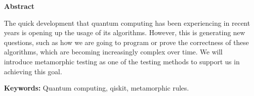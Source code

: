 \newpage

\thispagestyle{empty}

\begin{center}

{\bf \Huge Abstract}

  \end{center}
\vspace{1cm}

The quick development that quantum computing has been experiencing in recent years is opening up the usage of its algorithms. However, this is generating new questions, such as how we are going to program or prove the correctness of these algorithms, which are becoming increasingly complex over time. We will introduce metamorphic testing as one of the testing methods to support us in achieving this goal.
\vspace{2cm}

\textbf{Keywords:} Quantum computing, qiskit, metamorphic rules.